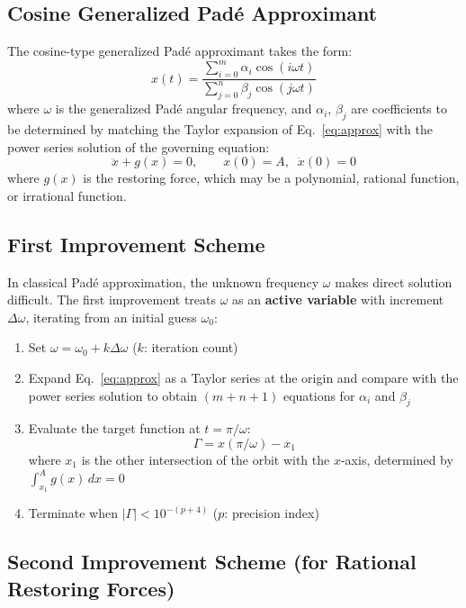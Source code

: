 \documentclass[11pt,a4paper]{article}
\begin{document}
\subsection{Cosine Generalized Pad\'e Approximant}

The cosine-type generalized Pad\'e approximant takes the form:
\begin{equation}
x(t) = \frac{\sum_{i=0}^{m} \alpha_i \cos(i\omega t)}{\sum_{j=0}^{n} \beta_j \cos(j\omega t)}
\label{eq:approx}
\end{equation}
where $\omega$ is the generalized Pad\'e angular frequency, and $\alpha_i$, $\beta_j$ are coefficients to be determined by matching the Taylor expansion of Eq.\ \eqref{eq:approx} with the power series solution of the governing equation:
\begin{equation}
\ddot{x} + g(x) = 0, \qquad x(0) = A,\;\; \dot{x}(0) = 0
\label{eq:model}
\end{equation}
where $g(x)$ is the restoring force, which may be a polynomial, rational function, or irrational function.

\subsection{First Improvement Scheme}

In classical Pad\'e approximation, the unknown frequency $\omega$ makes direct solution difficult. The first improvement treats $\omega$ as an \textbf{active variable} with increment $\Delta\omega$, iterating from an initial guess $\omega_0$:

\begin{enumerate}[leftmargin=2em]
\item Set $\omega = \omega_0 + k\Delta\omega$ ($k$: iteration count)
\item Expand Eq.\ \eqref{eq:approx} as a Taylor series at the origin and compare with the power series solution to obtain $(m+n+1)$ equations for $\alpha_i$ and $\beta_j$
\item Evaluate the target function at $t = \pi/\omega$:
\begin{equation}
\Gamma = x(\pi/\omega) - x_1
\end{equation}
where $x_1$ is the other intersection of the orbit with the $x$-axis, determined by $\int_{x_1}^{A} g(x)\,dx = 0$
\item Terminate when $|\Gamma| < 10^{-(p+4)}$ ($p$: precision index)
\end{enumerate}

\subsection{Second Improvement Scheme (for Rational Restoring Forces)}
\end{document}
